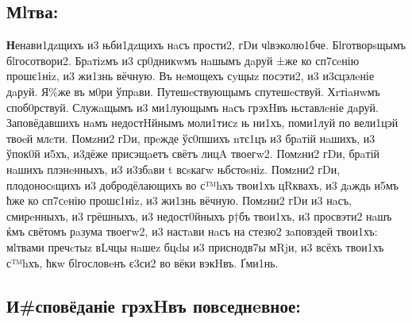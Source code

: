 \subsection{Мlтва:}

\textbf{Н}енави1дzщихъ и3 њби1дzщихъ нaсъ прости2, гDи чlвэколю1бче.
Бlготворsщымъ бlгосотвори2. Брaтіzмъ и3 ср0дникwмъ нaшымъ дaруй ±же ко
сп7сeнію прошє1ніz, и3 жи1знь вёчную. Въ нeмощехъ сyщыz посэти2, и3
и3сцэлeніе дaруй. Я\%же въ м0ри ўпрaви. Путешeствующымъ спутешeствуй.
Хrтіaнwмъ споб0рствуй. Служaщымъ и3 ми1лующымъ нaсъ грэхHвъ њставлeніе
дaруй. Заповёдавшихъ нaмъ недостHйнымъ моли1тисz њ ни1хъ, поми1луй по
вели1цэй твоeй млcти. Помzни2 гDи, прeжде ўс0пшихъ nтє1цъ и3 брaтій
нaшихъ, и3 ўпок0й и5хъ, и3дёже присэщaетъ свётъ лицA твоегw2. Помzни2
гDи, брaтій нaшихъ плэнeнныхъ, и3 и3збaви \textbar{} t всsкагw
њбстоsніz. Помzни2 гDи, плодоносsщихъ и3 добродёлающихъ во с™hхъ твои1хъ
цRквахъ, и3 дaждь и5мъ ћже ко сп7сeнію прошє1ніz, и3 жи1знь вёчную.
Помzни2 гDи и3 нaсъ, смирeнныхъ, и3 грёшныхъ, и3 недост0йныхъ р†бъ
твои1хъ, и3 просвэти2 нaшъ ќмъ свётомъ рaзума твоегw2, и3 настaви нaсъ
на стезю2 зaповэдей твои1хъ: мlтвами пречcтыz вLчцы нaшеz бцdы и3
приснодв7ы мRjи, и3 всёхъ твои1хъ с™hхъ, ћкw бlгословeнъ є3си2 во вёки
вэкHвъ. Ґми1нь.

\subsection{И\#сповёданіе грэхHвъ повседнeвное:}

